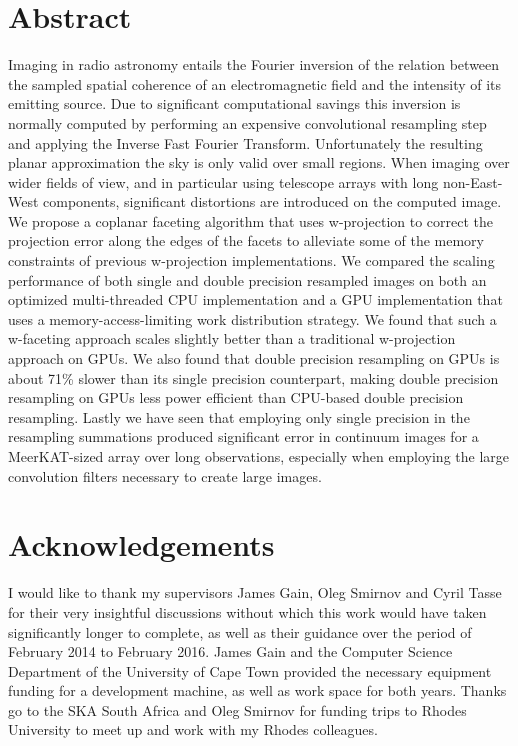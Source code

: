 \chapter*{Abstract}
 Imaging in radio astronomy entails the Fourier inversion of the relation between the sampled spatial coherence of an electromagnetic field and the intensity of its 
 emitting source. Due to significant computational savings this inversion is normally computed by performing an expensive convolutional resampling step and applying 
 the Inverse Fast Fourier Transform. Unfortunately the resulting planar approximation the sky is only valid over small regions. When imaging over wider fields of view,
 and in particular using telescope arrays with long non-East-West components, significant distortions are introduced on the computed image. We propose a coplanar faceting
 algorithm that uses w-projection to correct the projection error along the edges of the facets to alleviate some of the memory constraints of previous w-projection implementations. 
 We compared the scaling performance of both single and double precision resampled images on both an optimized multi-threaded CPU implementation and a GPU implementation that uses a 
 memory-access-limiting work distribution strategy. We found that such a w-faceting approach scales slightly better than a traditional w-projection approach on GPUs. We also found that
 double precision resampling on GPUs is about 71\% slower than its single precision counterpart, making double precision resampling on GPUs less power efficient than CPU-based double 
 precision resampling. Lastly we have seen that employing only single precision in the resampling summations produced significant error in continuum images for a MeerKAT-sized 
 array over long observations, especially when employing the large convolution filters necessary to create large images.
 
\chapter*{Acknowledgements}
 I would like to thank my supervisors James Gain, Oleg Smirnov and Cyril Tasse for their very insightful discussions without which this work would have taken significantly longer to complete, as well as 
 their guidance over the period of February 2014 to February 2016. James Gain and the Computer Science Department of the University of Cape Town provided the necessary equipment funding for a 
 development machine, as well as work space for both years. Thanks go to the SKA South Africa and Oleg Smirnov for funding trips to Rhodes University to meet up and work with my Rhodes colleagues.
 
